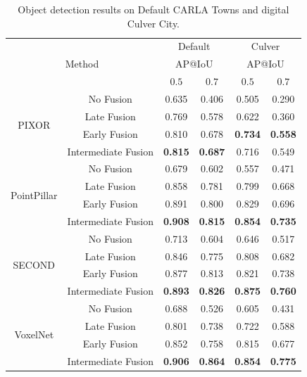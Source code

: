 \documentclass[letterpaper, 10 pt, conference]{ieeeconf}  %
\begin{document}
\begin{table}[]
    \centering
    \caption{Object detection results on Default CARLA Towns and digital Culver City.}
    \begin{tabular}{c|c|cc|cc}
        \toprule
        \multicolumn{2}{c|}{\multirow{3}{*}{Method}}&\multicolumn{2}{c|}{Default}&\multicolumn{2}{c}{Culver}\\
        \multicolumn{2}{c|}{}&\multicolumn{2}{c|}{AP@IoU}&\multicolumn{2}{c}{AP@IoU}\\
         \multicolumn{2}{c|}{}&$0.5$&$0.7$&$0.5$&$0.7$ \\
         \hline
        \multirow{4}{*}{PIXOR}&No Fusion&0.635 &0.406 &0.505&0.290\\
        &Late Fusion&0.769&0.578&0.622&0.360\\
        &Early Fusion&0.810&0.678&\textbf{0.734}&\textbf{0.558}\\
        &Intermediate Fusion&\textbf{0.815}&\textbf{0.687}&0.716&0.549\\
        \hline
        \multirow{4}{*}{PointPillar}&No Fusion&0.679&0.602&0.557&0.471\\
        &Late Fusion&0.858&0.781&0.799&0.668\\
        &Early Fusion&0.891&0.800&0.829&0.696\\
        &Intermediate Fusion&\textbf{0.908}&\textbf{0.815}&\textbf{0.854}&\textbf{0.735}\\
        \hline
        \multirow{4}{*}{SECOND}&No Fusion&0.713&0.604&0.646&0.517\\
        &Late Fusion&0.846&0.775&0.808&0.682\\
        &Early Fusion&0.877&0.813&0.821&0.738\\
        &Intermediate Fusion&\textbf{0.893}&\textbf{0.826}&\textbf{0.875} &\textbf{0.760}\\
        \hline
        \multirow{4}{*}{VoxelNet}&No Fusion&0.688&0.526&0.605&0.431\\
        &Late Fusion&0.801&0.738&0.722&0.588\\
        &Early Fusion&0.852&0.758&0.815&0.677\\
        &Intermediate Fusion&\textbf{0.906}&\textbf{0.864}&\textbf{0.854}&\textbf{0.775}\\
        \bottomrule
    \end{tabular}
    \label{table:benchmark_analysis}
\end{table}
\end{document}
